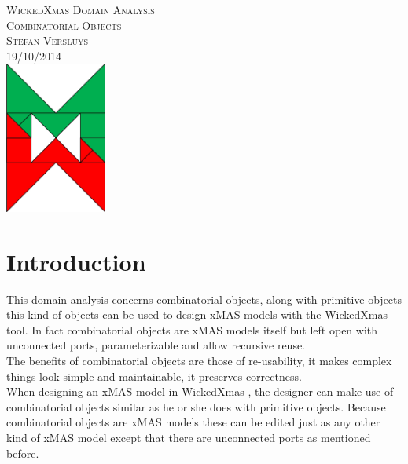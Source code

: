 \documentclass[a4paper,11pt,final]{article}
\begin{document}

\begin{titlepage}
	\vspace*{\fill}
    \begin{center}
    	\textsc{\large WickedXmas Domain Analysis}\\[0.5cm]
    	\textsc{\huge Combinatorial Objects}\\[0.5cm]
		\textsc{Stefan Versluys}\\
		\textsc{\scriptsize 19/10/2014}\\[2.0cm]
		\includegraphics[width=0.25\textwidth]{wXm}
	\end{center}
	\vspace*{\fill}
\end{titlepage}


\tableofcontents
\newpage


\section{Introduction}
This domain analysis concerns combinatorial objects, along with primitive objects this kind of objects can be used to design xMAS models with the WickedXmas tool. In fact combinatorial objects are xMAS models itself but left open with unconnected ports, parameterizable and allow recursive reuse.\\
The benefits of combinatorial objects are those of re-usability, it makes complex things look simple and maintainable, it preserves correctness.\\
When designing an xMAS model in WickedXmas , the designer can make use of combinatorial objects similar as he or she does with primitive objects. Because combinatorial objects are xMAS models these can be edited just as any other kind of xMAS model except that there are unconnected ports as mentioned before.
\end{document}
